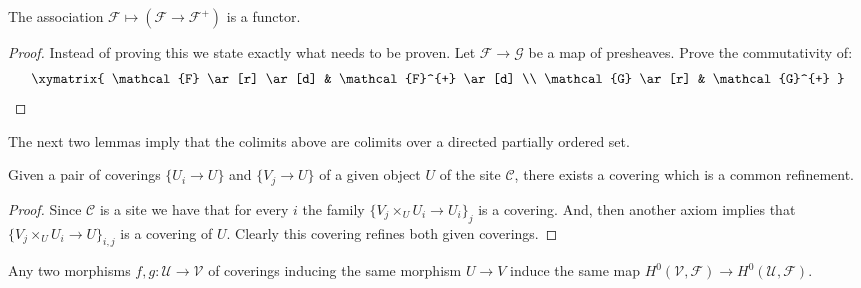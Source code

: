 \begin{lemma}
\label{lemma-plus-functorial}
The association $\mathcal{F} \mapsto
(\mathcal{F} \to \mathcal{F}^+)$
is a functor.
\end{lemma}

\begin{proof}
Instead of proving this we state exactly what needs to be proven.
Let $\mathcal{F} \to \mathcal{G}$ be a map of presheaves. Prove
the commutativity of:
$$
\xymatrix{
\mathcal{F} \ar[r] \ar[d]
&
\mathcal{F}^{+} \ar[d]
\\
\mathcal{G} \ar[r]
&
\mathcal{G}^{+}
}
$$
\end{proof}

\noindent
The next two lemmas imply that the colimits above are colimits
over a directed partially ordered set.

\begin{lemma}
\label{lemma-common-refinement}
Given a pair of coverings $\{U_i \to U\}$
and $\{V_j \to U\}$ of a given object $U$ of the site
$\mathcal{C}$, there exists a covering which is a
common refinement.
\end{lemma}

\begin{proof}
Since $\mathcal{C}$ is a site we have that for every $i$ the
family $\{V_j \times_U U_i \to U_i\}_j$ is a covering.
And, then another axiom implies that $\{V_j \times_U U_i \to U\}_{i, j}$
is a covering of $U$. Clearly this covering refines both given
coverings.
\end{proof}

\begin{lemma}
\label{lemma-independent-refinement}
Any two morphisms $f, g: \mathcal{U} \to \mathcal{V}$ of coverings
inducing the same morphism $U \to V$ induce the same
map $H^0(\mathcal{V}, \mathcal{F}) \to  H^0(\mathcal{U}, \mathcal{F})$.
\end{lemma}

